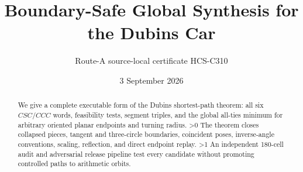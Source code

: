 \documentclass[10pt]{article}
\title{Boundary-Safe Global Synthesis for the Dubins Car}
\author{Route-A source-local certificate HCS-C310}
\date{3 September 2026}
\providecommand{\CRevisionRound}{2}
\begin{document}
\maketitle
\begin{abstract}
We give a complete executable form of the Dubins shortest-path theorem: all
six $CSC/CCC$ words, feasibility tests, segment triples, and the global
all-ties minimum for arbitrary oriented planar endpoints and turning radius.
\ifnum\CRevisionRound>0
The theorem closes collapsed pieces, tangent and three-circle boundaries,
coincident poses, inverse-angle conventions, scaling, reflection, and direct
endpoint replay.
\fi
\ifnum\CRevisionRound>1
An independent 180-cell audit and adversarial release pipeline test every
candidate without promoting controlled paths to arithmetic orbits.
\fi
\end{abstract}
\end{document}
